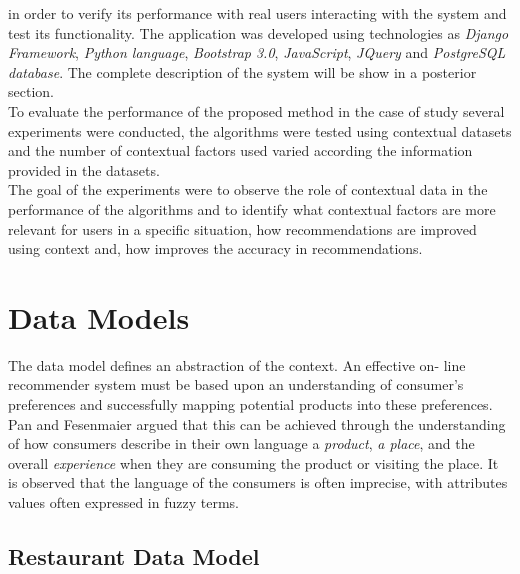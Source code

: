 in order to verify its performance with real users interacting with the system and
test  its functionality.  The application was developed using
technologies as \textit{Django Framework}, \textit{Python language}, 
\textit{Bootstrap 3.0},
\textit{JavaScript}, \textit{JQuery} and  \textit{PostgreSQL database}. 
The complete description of the system will be show in a posterior section.\\ 
To evaluate the performance of the proposed method in
the case of study several experiments were conducted, the algorithms
were tested using  contextual datasets and the number of contextual
factors used varied  according the information provided in the
datasets. \\ The goal of the  experiments were to observe the role of
contextual data  in the performance of the algorithms and to
identify what contextual factors are more relevant for users in a
specific situation, how recommendations are improved using context
and, how improves the accuracy in recommendations.

\section{Data Models}

The data model defines an abstraction of the context. An effective on-
line  recommender system must be based upon an understanding of
consumer's  preferences and successfully mapping potential products
into these preferences\cite{adomavicius2011context}. Pan and
Fesenmaier\cite{pan2006online} argued that this can be achieved
through the understanding of  how consumers describe in their own
language a \textit{product}, \textit{a place}, and the overall
\textit{experience}  when they are consuming the product or visiting
the place.  It is observed that  the language of the consumers is
often imprecise,  with attributes values often expressed in fuzzy
terms.

\subsection{Restaurant Data Model}

